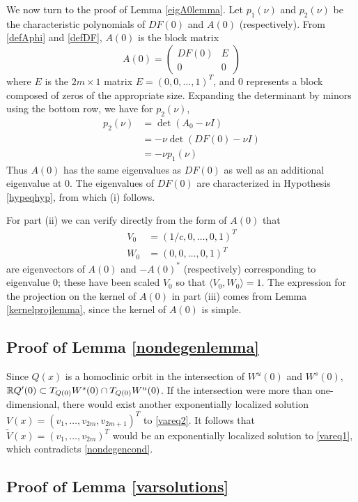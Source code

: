 \documentclass[thesis.tex]{subfiles}
\begin{document}
We now turn to the proof of Lemma \ref{eigA0lemma}. Let $p_1(\nu)$ and $p_2(\nu)$ be the characteristic polynomials of $DF(0)$ and $A(0)$ (respectively). From \eqref{defAphi} and \eqref{defDF}, $A(0)$ is the block matrix
\[
A(0) = \begin{pmatrix}
DF(0) & E \\
0 & 0
\end{pmatrix}
\]
where $E$ is the $2m \times 1$ matrix $E = (0, 0, \dots, 1)^T$, and $0$ represents a block composed of zeros of the appropriate size. Expanding the determinant by minors using the bottom row, we have for $p_2(\nu)$,
\begin{align*}
p_2(\nu) &= \det(A_0 - \nu I) \\
&= -\nu \det(DF(0) - \nu I) \\
&= -\nu p_1(\nu)
\end{align*}
Thus $A(0)$ has the same eigenvalues as $DF(0)$ as well as an additional eigenvalue at 0. The eigenvalues of $DF(0)$ are characterized in Hypothesis \ref{hypeqhyp}, from which (i) follows.

For part (ii) we can verify directly from the form of $A(0)$ that 
\begin{align*}
V_0 &= (1/c, 0, \dots, 0, 1)^T \\
W_0 &= (0, 0, \dots, 0, 1)^T
\end{align*}
are eigenvectors of $A(0)$ and $-A(0)^*$ (respectively) corresponding to eigenvalue 0; these have been scaled $V_0$ so that $\langle V_0, W_0 \rangle = 1$. The expression for the projection on the kernel of $A(0)$ in part (iii) comes from Lemma \ref{kernelprojlemma}, since the kernel of $A(0)$ is simple.

\subsection{Proof of Lemma \ref{nondegenlemma}}
Since $Q(x)$ is a homoclinic orbit in the intersection of $W^u(0)$ and $W^s(0)$, $\mathbb{R} Q'(0) \subset T_{Q(0)}W^s(0) \cap T_{Q(0)}W^u(0)$. If the intersection were more than one-dimensional, there would exist another exponentially localized solution $V(x) = (v_1, \dots, v_{2m}, v_{2m+1})^T$ to \eqref{vareq2}. It follows that $\tilde{V}(x) = (v_1, \dots, v_{2m})^T$ would be an exponentially localized solution to \eqref{vareq1}, which contradicts \eqref{nondegencond}.

\subsection{Proof of Lemma \ref{varsolutions}}
\end{document}

